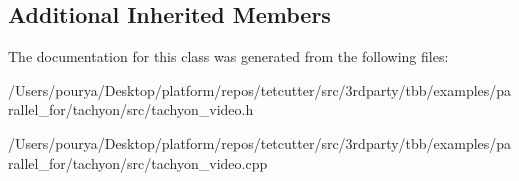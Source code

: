 \subsection*{Additional Inherited Members}


The documentation for this class was generated from the following files\+:\begin{DoxyCompactItemize}
\item 
/\+Users/pourya/\+Desktop/platform/repos/tetcutter/src/3rdparty/tbb/examples/parallel\+\_\+for/tachyon/src/tachyon\+\_\+video.\+h\item 
/\+Users/pourya/\+Desktop/platform/repos/tetcutter/src/3rdparty/tbb/examples/parallel\+\_\+for/tachyon/src/tachyon\+\_\+video.\+cpp\end{DoxyCompactItemize}
